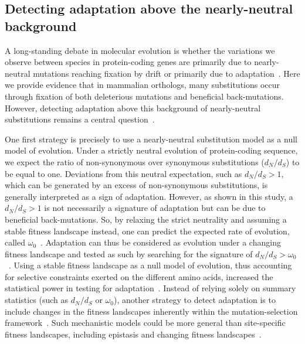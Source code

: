 \documentclass[12pt]{article}
\newcommand{\dn}{d_N}
\newcommand{\ds}{d_S}
\newcommand{\dnds}{\dn / \ds}
\begin{document}
\subsection*{Detecting adaptation above the nearly-neutral background}

A long-standing debate in molecular evolution is whether the variations we observe between species in protein-coding genes are primarily due to nearly-neutral mutations reaching fixation by drift or primarily due to adaptation~\cite{kimura_evolutionary_1968,kern_neutral_2018,jensen_importance_2019,gillespie_substitution_1994,Ohta1992}.
Here we provide evidence that in mammalian orthologs, many substitutions occur through fixation of both deleterious mutations and beneficial back-mutations.
However, detecting adaptation above this background of nearly-neutral substitutions remains a central question~\cite{kimura_evolutionary_1968,ohta_development_1996}.

One first strategy is precisely to use a nearly-neutral substitution model as a null model of evolution.
Under a strictly neutral evolution of protein-coding sequence, we expect the ratio of non-synonymous over synonymous substitutions ($\dnds$) to be equal to one.
Deviations from this neutral expectation, such as $\dnds > 1$, which can be generated by an excess of non-synonymous substitutions, is generally interpreted as a sign of adaptation.
However, as shown in this study, a $\dnds > 1$ is not necessarily a signature of adaptation but can be due to beneficial back-mutations.
So, by relaxing the strict neutrality and assuming a stable fitness landscape instead, one can predict the expected rate of evolution, called $\omega_0$~\cite{spielman_relationship_2015, dosreis_how_2015}.
Adaptation can thus be considered as evolution under a changing fitness landscape and tested as such by searching for the signature of $\dnds > \omega_0$~\cite{cvijovic_fate_2015, rodrigue_detecting_2017, rodrigue_bayesian_2021}.
Using a stable fitness landscape as a null model of evolution, thus accounting for selective constraints exerted on the different amino acids, increased the statistical power in testing for adaptation~\cite{latrille_genes_2023}.
Instead of relying solely on summary statistics (such as $\dnds$ or $\omega_0$), another strategy to detect adaptation is to include changes in the fitness landscapes inherently within the mutation-selection framework~\cite{tamuri_mutationselection_2021}.
Such mechanistic models could be more general than site-specific fitness landscapes, including epistasis and changing fitness landscapes~\cite{goldstein_sequence_2017, stolyarova_senescence_2020}.
\end{document}
